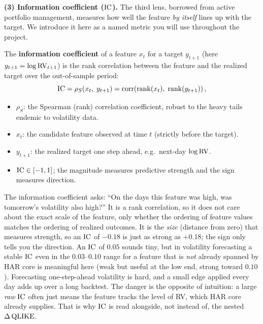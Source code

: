 \textbf{(3) Information coefficient ($\operatorname{IC}$).} The third lens, borrowed from active portfolio management, measures how well the feature \emph{by itself} lines up with the target. We introduce it here as a named metric you will use throughout the project.

\begin{definition}\label{def:ic}
The \textbf{information coefficient} of a feature $x_t$ for a target $y_{t+1}$ (here $y_{t+1} = \log \operatorname{RV}_{t+1}$) is the rank correlation between the feature and the realized target over the out-of-sample period:
\begin{equation}\label{eq:ic}
\operatorname{IC} = \rho_S\!\left(x_t,\; y_{t+1}\right) = \operatorname{corr}\!\left(\operatorname{rank}(x_t),\; \operatorname{rank}(y_{t+1})\right),
\end{equation}
\begin{itemize}[nosep]
  \item $\rho_S$: the Spearman (rank) correlation coefficient, robust to the heavy tails endemic to volatility data.
  \item $x_t$: the candidate feature observed at time $t$ (strictly before the target).
  \item $y_{t+1}$: the realized target one step ahead, e.g.\ next-day $\log \operatorname{RV}$.
  \item $\operatorname{IC} \in [-1, 1]$; the magnitude measures predictive strength and the sign measures direction.
\end{itemize}
\end{definition}

\begin{intuition}
The information coefficient asks: ``On the days this feature was high, was tomorrow's volatility also high?'' It is a rank correlation, so it does not care about the exact scale of the feature, only whether the ordering of feature values matches the ordering of realized outcomes. It is the \emph{size} (distance from zero) that measures strength, so an $\operatorname{IC}$ of $-0.18$ is just as strong as $+0.18$; the sign only tells you the direction. An $\operatorname{IC}$ of $0.05$ sounds tiny, but in volatility forecasting a stable $\operatorname{IC}$ even in the $0.03$--$0.10$ range for a feature that is \emph{not} already spanned by HAR core is meaningful here (weak but useful at the low end, strong toward $0.10$). Forecasting one-step-ahead volatility is hard, and a small edge applied every day adds up over a long backtest. The danger is the opposite of intuition: a large \emph{raw} $\operatorname{IC}$ often just means the feature tracks the level of RV, which HAR core already supplies. That is why $\operatorname{IC}$ is read alongside, not instead of, the nested $\Delta\operatorname{QLIKE}$.
\end{intuition}

